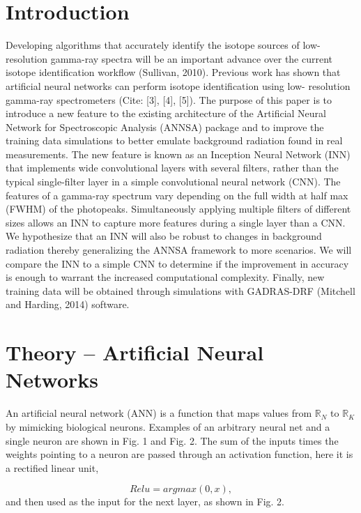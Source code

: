 \documentclass[11pt]{article}
\begin{document}
\section{Introduction}
Developing algorithms that accurately identify the isotope sources of low-resolution gamma-ray 
spectra will be an important advance over the current isotope identification workflow (Sullivan, 2010).
Previous work has shown that artificial neural networks can perform isotope identification using low-
resolution gamma-ray spectrometers (Cite: [3], [4], [5]). The purpose of this paper is to introduce 
a new feature to the existing architecture of the Artificial Neural Network for Spectroscopic Analysis 
(ANNSA) package and to improve the training data simulations to better emulate background radiation 
found in real measurements. The new feature is known as an Inception Neural Network (INN) that 
implements wide convolutional layers with several filters, rather than the typical single-filter layer 
in a simple convolutional neural network (CNN). The features of a gamma-ray spectrum vary depending 
on the full width at half max (FWHM) of the photopeaks. Simultaneously applying multiple filters of 
different sizes allows an INN to capture more features during a single layer than a CNN. We hypothesize 
that an INN will also be robust to changes in background radiation thereby generalizing the ANNSA 
framework to more scenarios. We will compare the INN to a simple CNN to determine if the improvement in 
accuracy is enough to warrant the increased computational complexity. Finally, new training data will 
be obtained through simulations with GADRAS-DRF (Mitchell and Harding, 2014) software.


\section{Theory -- Artificial Neural Networks}

An artificial neural network (ANN) is a function that maps values from ${\mathbb{R}}_{N}$ to ${\mathbb{R}}_{K}$ by mimicking biological 
neurons. Examples of an arbitrary neural net and a single neuron are shown in Fig. 1 and Fig. 2. The 
sum of the inputs times the weights pointing to a neuron are passed through an activation function, 
here it is a rectified linear unit,

\begin{equation}
Relu = argmax(0, x),
\end{equation}
and then used as the input for the next layer, as shown in Fig. 2. 
\end{document}
